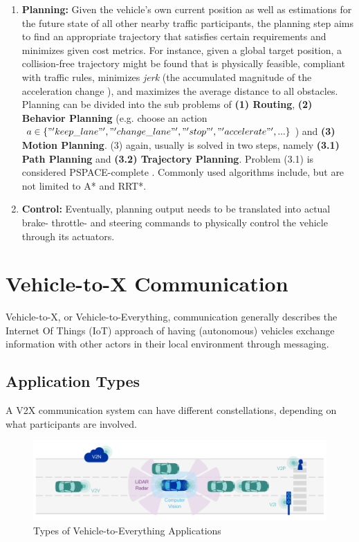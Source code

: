 \begin{enumerate}
	\item \textbf{Planning:} Given the vehicle's own current position as well as estimations for the future state of all other nearby traffic participants, the planning step aims to find an appropriate trajectory that satisfies certain requirements and minimizes given cost metrics. For instance, given a global target position, a collision-free trajectory might be found that is physically feasible, compliant with traffic rules, minimizes \textit{jerk} (the accumulated magnitude of the acceleration change \cite{paden2016survey}), and maximizes the average distance to all obstacles. Planning can be divided into the sub problems of \textbf{(1) Routing}, \textbf{(2) Behavior Planning} (e.g. choose an action $a \in \{ "'keep\_lane"', "'change\_lane"', "'stop"', "'accelerate"', ... \}$) and \textbf{(3) Motion Planning}. (3) again, usually is solved in two steps, namely \textbf{(3.1) Path Planning} and \textbf{(3.2) Trajectory Planning}. Problem (3.1) is considered PSPACE-complete \cite{paden2016survey}. Commonly used algorithms include, but are not limited to A* and RRT*.
	\item \textbf{Control:} Eventually, planning output needs to be translated into actual brake- throttle- and steering commands to physically control the vehicle through its actuators. 
\end{enumerate}

\section{Vehicle-to-X Communication}
\label{sec:background:v2x_communication}
Vehicle-to-X, or Vehicle-to-Everything, communication generally describes the Internet Of Things (IoT) approach of having (autonomous) vehicles exchange information with other actors in their local environment through messaging.

\subsection{Application Types}
\label{subsec:background:application_types}
A V2X communication system can have different constellations, depending on what participants are involved.

\begin{figure}[H]
	\centering
	\includegraphics[width=1.0\textwidth]{98_images/v2x_types.png}
	\caption[Types of Vehicle-to-Everything Applications]{Types of Vehicle-to-Everything Applications \cite{5GAutomotiveAssociation2016}}
	\label{fig:v2x_types}
\end{figure}

